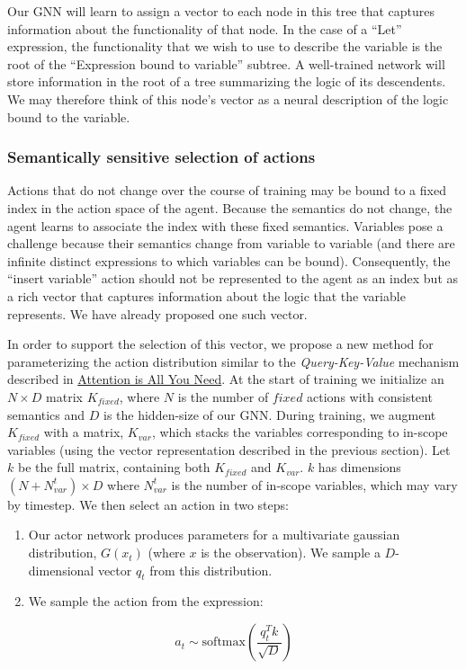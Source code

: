 \documentclass{article}
\begin{document}
\hspace{16}Our GNN will learn to assign a vector to each node in this tree that captures information about the functionality of that node. In the case of a “Let” expression, the functionality that we wish to use to describe the variable is the root of the “Expression bound to variable” subtree. A well-trained network will store information in the root of a tree summarizing the logic of its descendents. We may therefore think of this node’s vector as a neural description of the logic bound to the variable.

\subsubsection{Semantically sensitive selection of actions}
\hspace{16}Actions that do not change over the course of training may be bound to a fixed index in the action space of the agent. Because the semantics do not change, the agent learns to associate the index with these fixed semantics. Variables pose a challenge because their semantics change from variable to variable (and there are infinite distinct expressions to which variables can be bound). Consequently, the “insert variable” action should not be represented to the agent as an index but as a rich vector that captures information about the logic that the variable represents. We have already proposed one such vector.

\hspace{16}In order to support the selection of this vector, we propose a new method for parameterizing the action distribution similar to the \textit{Query-Key-Value} mechanism described in \href{https://arxiv.org/abs/1706.03762}{Attention is All You Need}. At the start of training we initialize an $N \times D$ matrix $K_{fixed}$, where $N$ is the number of $fixed$ actions with consistent semantics and $D$ is the hidden-size of our GNN. During training, we augment $K_{fixed}$ with a matrix, $K_{var}$, which stacks the variables corresponding to in-scope variables (using the vector representation described in the previous section). Let $k$ be the full matrix, containing both $K_{fixed}$ and $K_{var}$. $k$ has dimensions $(N + N^t_{var}) \times D$ where $N^t_{var}$ is the number of in-scope variables, which may vary by timestep. We then select an action in two steps:
\begin{enumerate}
    \item Our actor network produces parameters for a multivariate gaussian distribution, $G(x_t)$ (where $x$ is the observation). We sample a $D$-dimensional vector $q_t$ from this distribution.
    \item We sample the action from the expression:
\end{enumerate}
\begin{equation}
    a_t \sim \textrm{softmax}(\frac{q_t^Tk}{\sqrt{D}})
\end{equation}
\end{document}
